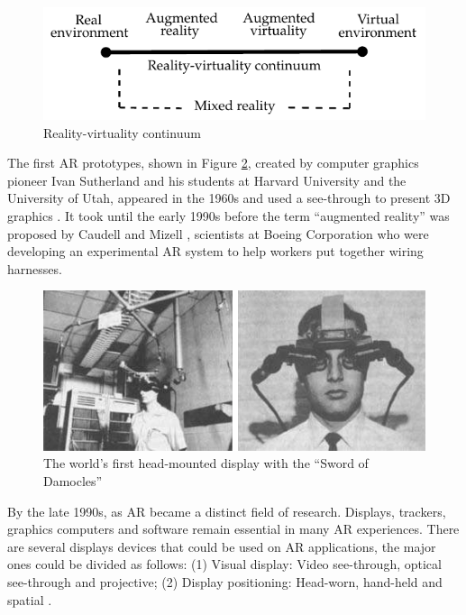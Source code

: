 \begin{figure}[!htb]
  \centering
  \includegraphics{chapters/basic_concepts/reality_continuum.pdf}
  \caption{Reality-virtuality continuum}
  \label{figure:reality_continuum}
\end{figure}

The first AR prototypes, shown in Figure \ref{figure:first_head_mount}, created by computer graphics pioneer Ivan Sutherland and his students at Harvard University and the University of Utah, appeared in the 1960s and used a see-through to present 3D graphics \cite{Benford1998}. It took until the early 1990s before the term ``augmented reality'' was proposed by Caudell and Mizell \cite{Benford1998}, scientists at Boeing Corporation who were developing an experimental AR system to help workers put together wiring harnesses.

\begin{figure}[!htb]
  \centering
  \includegraphics[width=\linewidth]{chapters/basic_concepts/first_head_mount.png}
  \caption{The world's first head-mounted display with the ``Sword of Damocles''}
  \label{figure:first_head_mount}
\end{figure}

By the late 1990s, as AR became a distinct field of research. Displays, trackers, graphics computers and software remain essential in many AR experiences. There are several displays devices that could be used on AR applications, the major ones could be divided as follows: (1) Visual display: Video see-through, optical see-through and projective; (2) Display positioning: Head-worn, hand-held and spatial \cite{Benford1998}.

